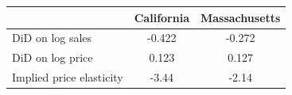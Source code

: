 \begin{tabular}{lcc}
\toprule
 & California & Massachusetts \\
\midrule
DiD on log sales & -0.422 & -0.272 \\
DiD on log price & 0.123 & 0.127 \\
Implied price elasticity & -3.44 & -2.14 \\
\bottomrule
\end{tabular}
